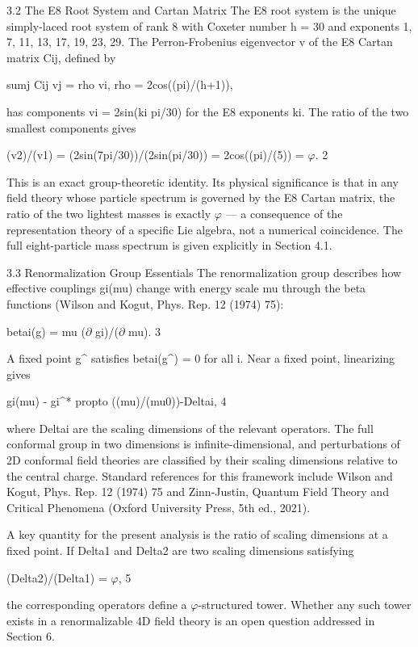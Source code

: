   3.2 The E8 Root System and Cartan Matrix
  The E8 root system is the unique simply-laced root system of rank 8 with Coxeter
  number h = 30 and exponents {1, 7, 11, 13, 17, 19, 23, 29}. The Perron-Frobenius
  eigenvector v of the E8 Cartan matrix Cij, defined by

  sumj Cij vj = rho vi, rho = 2cos((pi)/(h+1)),

  has components vi = 2sin(ki pi/30) for the E8 exponents ki. The ratio of the two smallest
  components gives

  (v2)/(v1) = (2sin(7pi/30))/(2sin(pi/30)) = 2cos((pi)/(5)) = $\varphi$. 2

  This is an exact group-theoretic identity. Its physical significance is that in any field
  theory whose particle spectrum is governed by the E8 Cartan matrix, the ratio of the
  two lightest masses is exactly $\varphi$ --- a consequence of the representation theory of a
  specific Lie algebra, not a numerical coincidence. The full eight-particle mass spectrum
  is given explicitly in Section 4.1.

  3.3 Renormalization Group Essentials
  The renormalization group describes how effective couplings gi(mu) change with
  energy scale mu through the beta functions (Wilson and Kogut, Phys. Rep. 12 (1974)
  75):

  betai(g) = mu ($\partial$ gi)/($\partial$ mu). 3

  A fixed point g^ satisfies betai(g^) = 0 for all i. Near a fixed point, linearizing gives

  gi(mu) - gi^* propto ((mu)/(mu0))-Deltai, 4

  where Deltai are the scaling dimensions of the relevant operators. The full conformal
  group in two dimensions is infinite-dimensional, and perturbations of 2D conformal field
  theories are classified by their scaling dimensions relative to the central charge.
  Standard references for this framework include Wilson and Kogut, Phys. Rep. 12 (1974)
  75 and Zinn-Justin, Quantum Field Theory and Critical Phenomena (Oxford University
  Press, 5th ed., 2021).

  A key quantity for the present analysis is the ratio of scaling dimensions at a fixed point.
  If Delta1 and Delta2 are two scaling dimensions satisfying

  (Delta2)/(Delta1) = $\varphi$, 5

  the corresponding operators define a $\varphi$-structured tower. Whether any such tower
  exists in a renormalizable 4D field theory is an open question addressed in Section 6.

